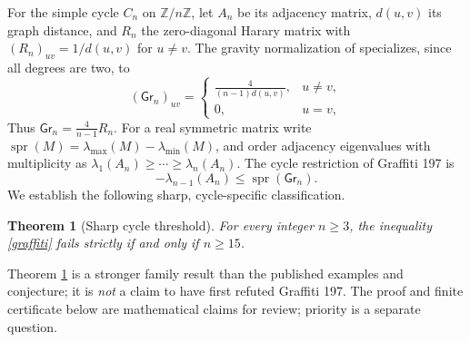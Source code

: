 \documentclass[10pt,twocolumn]{article}
\newtheorem{theorem}{Theorem}
\newcommand{\Gr}{\mathsf{Gr}}
\newcommand{\spr}{\operatorname{spr}}
\newcommand{\lammin}{\lambda_{\min}}
\newcommand{\lammax}{\lambda_{\max}}
\begin{document}
For the simple cycle $C_n$ on $\mathbb Z/n\mathbb Z$, let $A_n$ be its adjacency matrix, $d(u,v)$ its graph distance, and $R_n$ the zero-diagonal Harary matrix with $(R_n)_{uv}=1/d(u,v)$ for $u\ne v$. The gravity normalization of \cite{Roucairol2025} specializes, since all degrees are two, to
\begin{equation}\label{gravity}
(\Gr_n)_{uv}=\begin{cases}\displaystyle \frac{4}{(n-1)d(u,v)},&u\ne v,\\0,&u=v,\end{cases}
\end{equation}
Thus $\Gr_n=\frac4{n-1}R_n$.
For a real symmetric matrix write $\spr(M)=\lammax(M)-\lammin(M)$, and order adjacency eigenvalues with multiplicity as $\lambda_1(A_n)\ge\cdots\ge\lambda_n(A_n)$.
The cycle restriction of Graffiti 197 is
\begin{equation}\label{graffiti}
-\lambda_{n-1}(A_n)\le \spr(\Gr_n).
\end{equation}
We establish the following sharp, cycle-specific classification.
\begin{theorem}[Sharp cycle threshold]\label{main}
For every integer $n\ge3$, the inequality \eqref{graffiti} fails strictly if and only if $n\ge15$.
\end{theorem}
Theorem \ref{main} is a stronger family result than the published examples and conjecture; it is \emph{not} a claim to have first refuted Graffiti 197. The proof and finite certificate below are mathematical claims for review; priority is a separate question.
\end{document}
